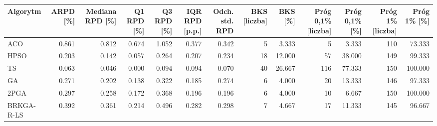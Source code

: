\begin{tabular}{lrrrrrrrrrrrr}
\toprule
Algorytm & ARPD [\%] & Mediana RPD [\%] & Q1 RPD [\%] & Q3 RPD [\%] & IQR RPD [p.p.] & Odch. std. RPD & BKS [liczba] & BKS [\%] & Próg 0,1\% [liczba] & Próg 0,1\% [\%] & Próg 1\% [liczba] & Próg 1\% [\%] \\
\midrule
ACO & 0.861 & 0.812 & 0.674 & 1.052 & 0.377 & 0.342 & 5 & 3.333 & 5 & 3.333 & 110 & 73.333 \\
HPSO & 0.203 & 0.142 & 0.057 & 0.264 & 0.207 & 0.234 & 18 & 12.000 & 57 & 38.000 & 149 & 99.333 \\
TS & 0.063 & 0.046 & 0.000 & 0.094 & 0.094 & 0.070 & 40 & 26.667 & 116 & 77.333 & 150 & 100.000 \\
GA & 0.271 & 0.202 & 0.138 & 0.322 & 0.185 & 0.274 & 6 & 4.000 & 20 & 13.333 & 146 & 97.333 \\
2PGA & 0.297 & 0.258 & 0.172 & 0.368 & 0.196 & 0.196 & 6 & 4.000 & 10 & 6.667 & 150 & 100.000 \\
BRKGA-R-LS & 0.392 & 0.361 & 0.214 & 0.496 & 0.282 & 0.298 & 7 & 4.667 & 17 & 11.333 & 145 & 96.667 \\
\bottomrule
\end{tabular}
